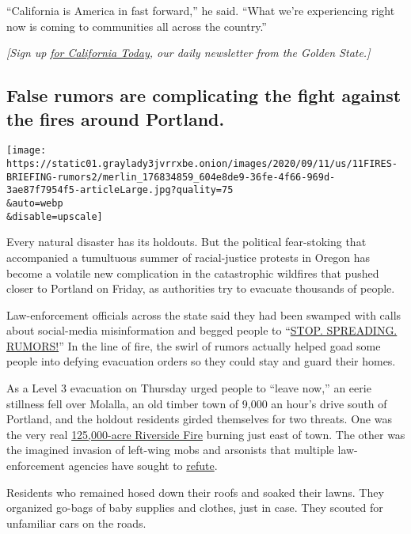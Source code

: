 ``California is America in fast forward,'' he said. ``What we're
experiencing right now is coming to communities all across the
country.''

\emph{{[}Sign up}
\href{https://www.nytimes3xbfgragh.onion/newsletters/california-today}{\emph{for
California Today}}\emph{, our daily newsletter from the Golden
State.{]}}

\hypertarget{false-rumors-are-complicating-the-fight-against-the-fires-around-portland}{%
\subsection{False rumors are complicating the fight against the fires
around
Portland.}\label{false-rumors-are-complicating-the-fight-against-the-fires-around-portland}}

\texttt{[image: https://static01.graylady3jvrrxbe.onion/images/2020/09/11/us/11FIRES-BRIEFING-rumors2/merlin\_176834859\_604e8de9-36fe-4f66-969d-3ae87f7954f5-articleLarge.jpg?quality=75\\\&auto=webp\\\&disable=upscale]}

Every natural disaster has its holdouts. But the political fear-stoking
that accompanied a tumultuous summer of racial-justice protests in
Oregon has become a volatile new complication in the catastrophic
wildfires that pushed closer to Portland on Friday, as authorities try
to evacuate thousands of people.

Law-enforcement officials across the state said they had been swamped
with calls about social-media misinformation and begged people to
``\href{https://www.facebookcorewwwi.onion/DouglasCoSO/posts/3294100377341103}{STOP.
SPREADING. RUMORS!}'' In the line of fire, the swirl of rumors actually
helped goad some people into defying evacuation orders so they could
stay and guard their homes.

As a Level 3 evacuation on Thursday urged people to ``leave now,'' an
eerie stillness fell over Molalla, an old timber town of 9,000 an hour's
drive south of Portland, and the holdout residents girded themselves for
two threats. One was the very real
\href{https://inciweb.nwcg.gov/}{125,000-acre Riverside Fire} burning
just east of town. The other was the imagined invasion of left-wing mobs
and arsonists that multiple law-enforcement agencies have sought to
\href{https://www.nytimes3xbfgragh.onion/2020/09/10/us/wildfires-misinformation-arson-activists.html?referringSource=articleShare}{refute}.

Residents who remained hosed down their roofs and soaked their lawns.
They organized go-bags of baby supplies and clothes, just in case. They
scouted for unfamiliar cars on the roads.

